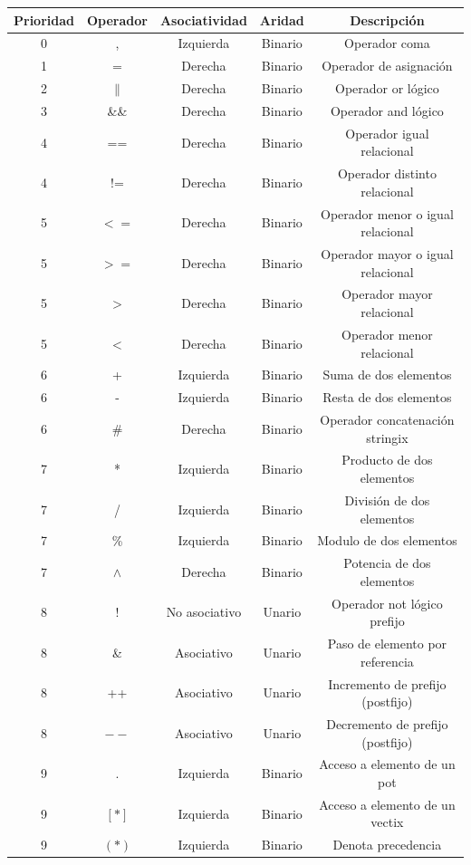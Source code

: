 \documentclass[a4paper, 10pt]{article}
\begin{document}
    \begin{table}[t]
    \begin{center}
    \begin{tabular}{| c | c | c | c | c |}
    \hline
        Prioridad & Operador & Asociatividad & Aridad & Descripción \\ \hline
        0 & , & Izquierda & Binario & Operador coma \\ \hline
        1 & $=$ & Derecha & Binario & Operador de asignación \\ \hline
        2 & $\|$ & Derecha & Binario & Operador or lógico \\ \hline
        3 & \&\& & Derecha & Binario & Operador and lógico \\ \hline
        4 & == & Derecha & Binario & Operador igual relacional \\ \hline
        4 & != & Derecha & Binario & Operador distinto relacional \\ \hline
        5 & $<=$ & Derecha & Binario & Operador menor o igual relacional \\ \hline
        5 & $>=$ & Derecha & Binario & Operador mayor o igual relacional \\ \hline
        5 & $>$ & Derecha & Binario & Operador mayor relacional \\ \hline
        5 & $<$ & Derecha & Binario & Operador menor relacional \\ \hline
        6 & + & Izquierda & Binario & Suma de dos elementos \\ \hline
        6 & - & Izquierda & Binario & Resta de dos elementos \\ \hline
        6 & \# & Derecha & Binario & Operador concatenación stringix \\ \hline
        7 & * & Izquierda & Binario & Producto de dos elementos \\ \hline
        7 & / & Izquierda & Binario & División de dos elementos \\ \hline
        7 & \% & Izquierda & Binario & Modulo de dos elementos \\ \hline
        7 & $\wedge$ & Derecha & Binario & Potencia de dos elementos \\ \hline
        8 & ! & No asociativo & Unario & Operador not lógico prefijo \\ \hline
        8 & \& & Asociativo & Unario & Paso de elemento por referencia \\ \hline
        8 & ++ & Asociativo & Unario & Incremento de prefijo (postfijo)\\ \hline
        8 & $--$ & Asociativo & Unario & Decremento de prefijo (postfijo)\\ \hline
        9 & . & Izquierda & Binario & Acceso a elemento de un pot \\ \hline
        9 & $[*]$ & Izquierda & Binario & Acceso a elemento de un vectix \\ \hline
        9 & $(*)$ & Izquierda & Binario & Denota precedencia \\ \hline
        


\end{tabular}
\end{center}
\end{table}
\end{document}
